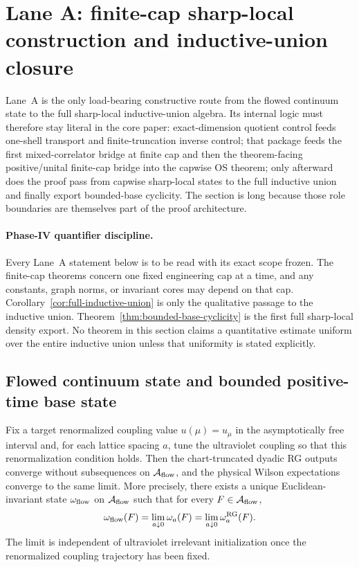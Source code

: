 \section{Lane A: finite-cap sharp-local construction and inductive-union closure}\label{sec:laneA}

Lane~A is the only load-bearing constructive route from the flowed continuum state to the full sharp-local inductive-union algebra. Its internal logic must therefore stay literal in the core paper: exact-dimension quotient control feeds one-shell transport and finite-truncation inverse control; that package feeds the first mixed-correlator bridge at finite cap and then the theorem-facing positive/unital finite-cap bridge into the capwise OS theorem; only afterward does the proof pass from capwise sharp-local states to the full inductive union and finally export bounded-base cyclicity. The section is long because those role boundaries are themselves part of the proof architecture.

\paragraph{Phase-IV quantifier discipline.}
Every Lane~A statement below is to be read with its exact scope frozen. The finite-cap theorems concern one fixed engineering cap at a time, and any constants, graph norms, or invariant cores may depend on that cap. Corollary~\ref{cor:full-inductive-union} is only the qualitative passage to the inductive union. Theorem~\ref{thm:bounded-base-cyclicity} is the first full sharp-local density export. No theorem in this section claims a quantitative estimate uniform over the entire inductive union unless that uniformity is stated explicitly.

\subsection{Flowed continuum state and bounded positive-time base state}

\begin{theorem}\label{thm:flowed-state}
Fix a target renormalized coupling value $u(\mu)=u_\mu$ in the asymptotically free interval and, for each lattice spacing $a$, tune the ultraviolet coupling so that this renormalization condition holds. Then the chart-truncated dyadic RG outputs converge without subsequences on $\mathcal{A}_{\mathrm{flow}}$, and the physical Wilson expectations converge to the same limit. More precisely, there exists a unique Euclidean-invariant state $\omega_{\mathrm{flow}}$ on $\mathcal{A}_{\mathrm{flow}}$ such that for every $F\in\mathcal{A}_{\mathrm{flow}}$,
\[
\omega_{\mathrm{flow}}(F)=\lim_{a\downarrow 0}\omega_a(F)=\lim_{a\downarrow 0}\omega_a^{\mathrm{RG}}(F).
\]
The limit is independent of ultraviolet irrelevant initialization once the renormalized coupling trajectory has been fixed.
\end{theorem}

